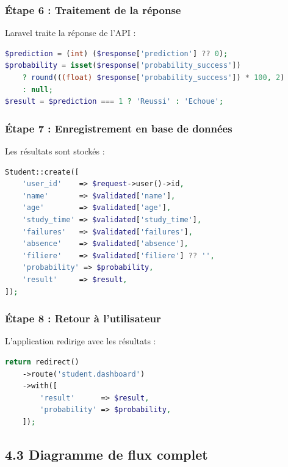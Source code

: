 \documentclass[12pt,a4paper]{article}
\begin{document}
\subsubsection{Étape 6 : Traitement de la réponse}

Laravel traite la réponse de l'API :

\begin{lstlisting}[language=php]
$prediction = (int) ($response['prediction'] ?? 0);
$probability = isset($response['probability_success'])
    ? round(((float) $response['probability_success']) * 100, 2)
    : null;
$result = $prediction === 1 ? 'Reussi' : 'Echoue';
\end{lstlisting}

\subsubsection{Étape 7 : Enregistrement en base de données}

Les résultats sont stockés :

\begin{lstlisting}[language=php]
Student::create([
    'user_id'    => $request->user()->id,
    'name'       => $validated['name'],
    'age'        => $validated['age'],
    'study_time' => $validated['study_time'],
    'failures'   => $validated['failures'],
    'absence'    => $validated['absence'],
    'filiere'    => $validated['filiere'] ?? '',
    'probability' => $probability,
    'result'     => $result,
]);
\end{lstlisting}

\subsubsection{Étape 8 : Retour à l'utilisateur}

L'application redirige avec les résultats :

\begin{lstlisting}[language=php]
return redirect()
    ->route('student.dashboard')
    ->with([
        'result'      => $result,
        'probability' => $probability,
    ]);
\end{lstlisting}

\newpage

\subsection{4.3 Diagramme de flux complet}
\end{document}
